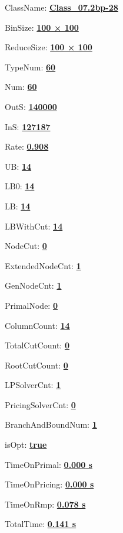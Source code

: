 \documentclass[11pt]{article}
\begin{document}
\pagestyle{empty}


ClassName: \underline{\textbf{Class_07.2bp-28}}
\par
BinSize: \underline{\textbf{100 × 100}}
\par
ReduceSize: \underline{\textbf{100 × 100}}
\par
TypeNum: \underline{\textbf{60}}
\par
Num: \underline{\textbf{60}}
\par
OutS: \underline{\textbf{140000}}
\par
InS: \underline{\textbf{127187}}
\par
Rate: \underline{\textbf{0.908}}
\par
UB: \underline{\textbf{14}}
\par
LB0: \underline{\textbf{14}}
\par
LB: \underline{\textbf{14}}
\par
LBWithCut: \underline{\textbf{14}}
\par
NodeCut: \underline{\textbf{0}}
\par
ExtendedNodeCnt: \underline{\textbf{1}}
\par
GenNodeCnt: \underline{\textbf{1}}
\par
PrimalNode: \underline{\textbf{0}}
\par
ColumnCount: \underline{\textbf{14}}
\par
TotalCutCount: \underline{\textbf{0}}
\par
RootCutCount: \underline{\textbf{0}}
\par
LPSolverCnt: \underline{\textbf{1}}
\par
PricingSolverCnt: \underline{\textbf{0}}
\par
BranchAndBoundNum: \underline{\textbf{1}}
\par
isOpt: \underline{\textbf{true}}
\par
TimeOnPrimal: \underline{\textbf{0.000 s}}
\par
TimeOnPricing: \underline{\textbf{0.000 s}}
\par
TimeOnRmp: \underline{\textbf{0.078 s}}
\par
TotalTime: \underline{\textbf{0.141 s}}
\par
\newpage


\end{document}
